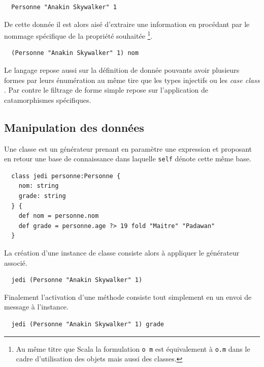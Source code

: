 \documentclass[twoside,a4paper]{article}
\begin{document}
\lstset{language=Thicket}
\begin{lstlisting}
  Personne "Anakin Skywalker" 1 
\end{lstlisting}

De  cette donnée  il  est  alors aisé  d'extraire  une information  en
procédant par le nommage spécifique de la propriété souhaitée 
\footnote{Au  même  titre que  Scala  la  formulation  {\tt o  m}  est
  équivalement à {\tt o.m} dans le cadre d'utilisation des objets mais
  aussi des classes.}.

\lstset{language=Thicket}
\begin{lstlisting}
  (Personne "Anakin Skywalker" 1) nom
\end{lstlisting}

Le langage  repose aussi  sur la définition  de donnée  pouvants avoir
plusieurs  formes par  leurs énumération  au même  tire que  les types
injectifs  \cite{ocaml}   \cite{haskell}  ou  les  {\it   case  class}
\cite{scala}.   Par contre  le  filtrage de  forme  simple repose  sur
l'application de catamorphismes \cite{meijer1991functional} spécifiques.

\subsection{Manipulation des données}

Une classe  est un générateur  prenant en paramètre une  expression et
proposant en retour une base  de connaissance dans laquelle {\tt self}
dénote cette même  base.

\lstset{language=Thicket}
\begin{lstlisting}
  class jedi personne:Personne {
    nom: string
    grade: string
  } {
    def nom = personne.nom
    def grade = personne.age ?> 19 fold "Maitre" "Padawan"
  }
\end{lstlisting}

La création  d'une instance  de classe consiste  alors à  appliquer le
générateur associé.

\lstset{language=Thicket}
\begin{lstlisting}
  jedi (Personne "Anakin Skywalker" 1)
\end{lstlisting}

Finalement l'activation  d'une méthode consiste tout  simplement en un
envoi de message à l'instance.

\lstset{language=Thicket}
\begin{lstlisting}
  jedi (Personne "Anakin Skywalker" 1) grade
\end{lstlisting}
\end{document}
